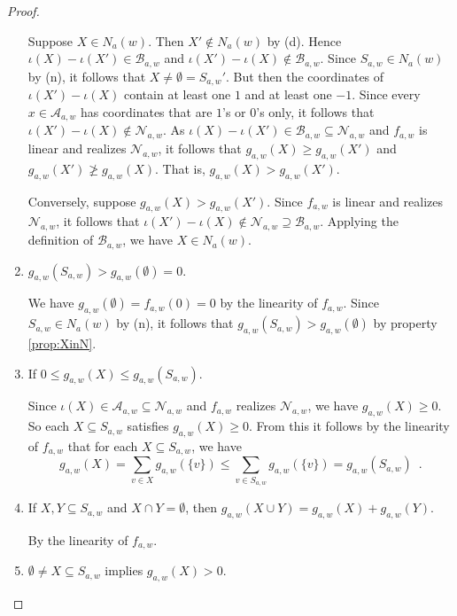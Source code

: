 \documentclass[12pt]{article}
\theoremstyle{definition}
\begin{document}
\begin{proof}
\begin{enumerate}
    Suppose $X\in N_a(w)$. Then $X'\notin N_a(w)$ by (d).  Hence
    $\iota(X)-\iota(X')\in\mathcal{B}_{a,w}$ and
    $\iota(X')-\iota(X)\notin\mathcal{B}_{a,w}$.  Since $S_{a,w}\in
    N_a(w)$ by (n), it follows that $X\neq\emptyset=S_{a,w}'$.  But
    then the coordinates of $\iota(X')-\iota(X)$ contain at least one
    $1$ and at least one $-1$.  Since every $x\in\mathcal{A}_{a,w}$
    has coordinates that are $1$'s or $0$'s only, it follows that
    $\iota(X')-\iota(X)\notin\mathcal{N}_{a,w}$.  As
    $\iota(X)-\iota(X')\in\mathcal{B}_{a,w}\subseteq
    \mathcal{N}_{a,w}$ and $f_{a,w}$ is linear and realizes
    $\mathcal{N}_{a,w}$, it follows that $g_{a,w}(X)\geq g_{a,w}(X')$
    and $g_{a,w}(X')\ngeq g_{a,w}(X)$.  That is,
    $g_{a,w}(X)>g_{a,w}(X')$.

    Conversely, suppose $g_{a,w}(X)>g_{a,w}(X')$. Since $f_{a,w}$ is
    linear and realizes $\mathcal{N}_{a,w}$, it follows that
    $\iota(X')-\iota(X)\notin\mathcal{N}_{a,w}\supseteq
    \mathcal{B}_{a,w}$. Applying the definition of
    $\mathcal{B}_{a,w}$, we have $X\in N_a(w)$.

  \item \label{prop:emptyS} $g_{a,w}(S_{a,w})>g_{a,w}(\emptyset)=0$.

    We have $g_{a,w}(\emptyset)=f_{a,w}(0)=0$ by the linearity of
    $f_{a,w}$.  Since $S_{a,w}\in N_a(w)$ by (n), it follows that
    $g_{a,w}(S_{a,w})>g_{a,w}(\emptyset)$ by property \ref{prop:XinN}.

  \item \label{prop:zerotoS} If $0\leq g_{a,w}(X)\leq
    g_{a,w}(S_{a,w})$.
    
    Since $\iota(X)\in\mathcal{A}_{a,w}\subseteq \mathcal{N}_{a,w}$
    and $f_{a,w}$ realizes $\mathcal{N}_{a,w}$, we have
    $g_{a,w}(X)\geq 0$.  So each $X\subseteq S_{a,w}$ satisfies
    $g_{a,w}(X)\geq 0$.  From this it follows by the linearity of
    $f_{a,w}$ that for each $X\subseteq S_{a,w}$, we have
    \[
    \textstyle g_{a,w}(X)=\sum_{v\in X}g_{a,w}(\{v\}) \leq\sum_{v\in
      S_{a,w}}g_{a,w}(\{v\}) =g_{a,w}(S_{a,w})\enspace.
    \]

  \item \label{prop:additivity} If $X,Y\subseteq S_{a,w}$ and $X\cap
    Y=\emptyset$, then $g_{a,w}(X\cup Y)=g_{a,w}(X)+g_{a,w}(Y)$.
    
    By the linearity of $f_{a,w}$.

  \item \label{prop:fullsupport} $\emptyset\neq X\subseteq S_{a,w}$
    implies $g_{a,w}(X)>0$.


\end{enumerate}
\end{proof}
\end{document}

